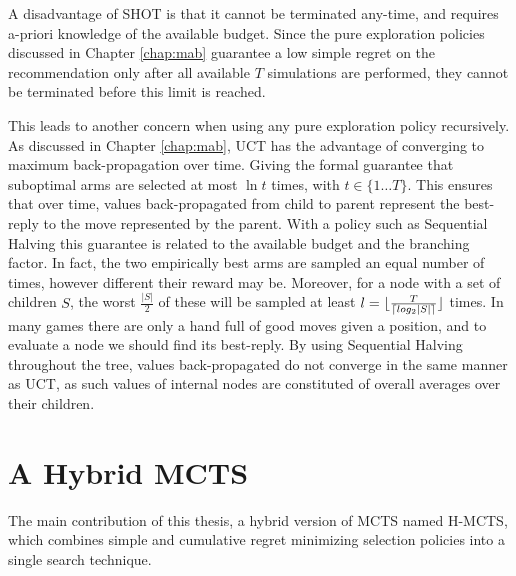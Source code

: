 \documentclass{kecsmstr}
\DeclarePairedDelimiter{\ceil}{\lceil}{\rceil}
\DeclarePairedDelimiter{\floor}{\lfloor}{\rfloor}
\begin{document}
A disadvantage of SHOT is that it cannot be terminated any-time, and requires a-priori knowledge of the available budget. Since the pure exploration policies discussed in Chapter \ref{chap:mab} guarantee a low simple regret on the recommendation only after all available $T$ simulations are performed, they cannot be terminated before this limit is reached.

 This leads to another concern when using any pure exploration policy recursively. As discussed in Chapter \ref{chap:mab}, UCT has the advantage of converging to maximum back-propagation over time. Giving the formal guarantee that suboptimal arms are selected at most $\ln{t}$ times, with $t\in \{1\dots T\}$. This ensures that over time, values back-propagated from child to parent represent the best-reply to the move represented by the parent. With a policy such as Sequential Halving this guarantee is related to the available budget and the branching factor. In fact, the two empirically best arms are sampled an equal number of times, however different their reward may be. Moreover, for a node with a set of children $S$, the worst $\frac{|S|}{2}$ of these will be sampled at least $l = \floor{\frac{T}{\ceil{log_2{|S|}}}}$ times. In many games there are only a hand full of good moves given a position, and to evaluate a node we should find its best-reply. By using Sequential Halving throughout the tree, values back-propagated do not converge in the same manner as UCT, as such values of internal nodes are constituted of overall averages over their children.
 \let\cleardoublepage\clearpage
\chapter{A Hybrid MCTS}
\label{chap:hybmcts}
\begin{chaptercontents}
The main contribution of this thesis, a hybrid version of MCTS named H-MCTS, which combines simple and cumulative regret minimizing selection policies into a single search technique.
\end{chaptercontents}
\end{document}
